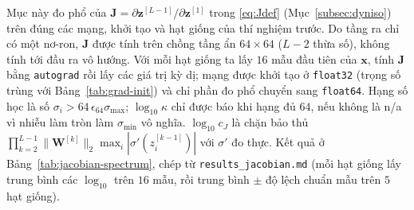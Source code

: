 Mục này đo phổ của $\mathbf{J}=\partial\mathbf{z}^{[L-1]}/\partial\mathbf{z}^{[1]}$ trong
\eqref{eq:Jdef} (Mục~\ref{subsec:dyniso}) trên đúng các mạng, khởi tạo và hạt giống của
thí nghiệm trước. Do tầng ra chỉ có một nơ-ron, $\mathbf{J}$ được tính trên chồng
tầng ẩn $64\times64$ ($L-2$ thừa số), không tính tới đầu ra vô hướng. Với mỗi hạt giống ta lấy
$16$ mẫu đầu tiên của $\mathbf{x}$, tính $\mathbf{J}$ bằng \texttt{autograd} rồi lấy
các giá trị kỳ dị; mạng được khởi tạo ở \texttt{float32} (trọng số trùng với
Bảng~\ref{tab:grad-init}) và chỉ phần đo phổ chuyển sang \texttt{float64}. Hạng số học là số
$\sigma_i>64\,\epsilon_{64}\sigma_{\max}$; $\log_{10}\kappa$ chỉ được báo khi hạng đủ $64$,
nếu không là n/a vì nhiễu làm tròn làm $\sigma_{\min}$ vô nghĩa. $\log_{10}c_J$ là chặn
bảo thủ $\prod_{k=2}^{L-1}\|\mathbf{W}^{[k]}\|_2\max_i|\sigma'(z^{[k-1]}_i)|$ với $\sigma'$ đo thực.
Kết quả ở Bảng~\ref{tab:jacobian-spectrum}, chép từ \texttt{results\_jacobian.md}
(mỗi hạt giống lấy trung bình các $\log_{10}$ trên $16$ mẫu, rồi trung bình $\pm$ độ lệch
chuẩn mẫu trên $5$ hạt giống).

